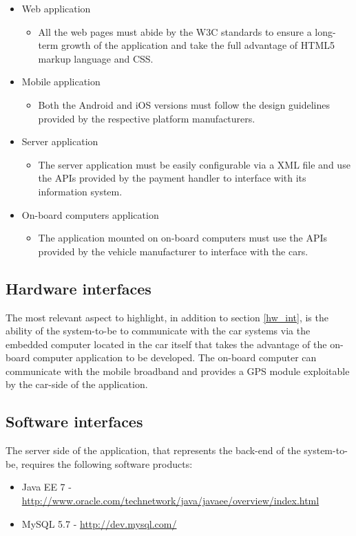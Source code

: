 \begin{itemize}
\item Web application
	\begin{itemize}
	\item[] All the web pages must abide by the W3C standards to ensure a long-term growth of the application and take the full advantage of HTML5 markup language and CSS.
	\end{itemize}
\item Mobile application
	\begin{itemize}
	\item[] Both the Android and iOS versions must follow the design guidelines provided by the respective platform manufacturers.
	\end{itemize}
\item Server application
	\begin{itemize}
	\item[] The server application must be easily configurable via a XML file and use the APIs provided by the payment handler to interface with its information system.
	\end{itemize}
\item On-board computers application
	\begin{itemize}
	\item[] The application mounted on on-board computers must use the APIs provided by the vehicle manufacturer to interface with the cars.
	\end{itemize}
\end{itemize}

\subsection{Hardware interfaces}
The most relevant aspect to highlight, in addition to section \ref{hw_int}, is the ability of the system-to-be to communicate with the car systems via the embedded computer located in the car itself that takes the advantage of the on-board computer application to be developed. The on-board computer can communicate with the mobile broadband and provides a GPS module exploitable by the car-side of the application.

\subsection{Software interfaces}
The server side of the application, that represents the back-end of the system-to-be, requires the following software products:
\begin{itemize}
\item Java EE 7 - \url{http://www.oracle.com/technetwork/java/javaee/overview/index.html}
\item MySQL 5.7 - \url{http://dev.mysql.com/}
\end{itemize}

